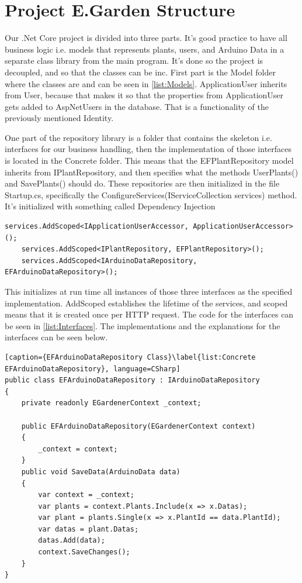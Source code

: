\documentclass[a4paper,12pt,oneside,openright,titlepage]{book}
\begin{document}
\section{Project E.Garden Structure}
Our .Net Core project is divided into three parts. It's good practice to have all business logic i.e. models that represents plants, users, and Arduino Data in a separate class library from the main program. It's done so the project is decoupled, and so that the classes can be inc. First part is the Model folder where the classes are and can be seen in \ref{list:Models}. ApplicationUser inherits from User, because that makes it so that the properties from ApplicationUser gets added to AspNetUsers in the database. That is a functionality of the previously mentioned Identity. 


One part of the repository library is a folder that contains the skeleton i.e. interfaces for our business handling, then the implementation of those interfaces is located in the Concrete folder. This means that the EFPlantRepository model inherits from IPlantRepository, and then specifies what the methods UserPlants() and SavePlants() should do. These repositories are then initialized in the file Startup.cs, specifically the ConfigureServices(IServiceCollection services) method. It's initialized with something called Dependency Injection\cite{DependencyInjection}


\label{list:DpInjection}
\begin{lstlisting}[caption={Dependency Injection}, language=CSharp]
	services.AddScoped<IApplicationUserAccessor, ApplicationUserAccessor>();
	services.AddScoped<IPlantRepository, EFPlantRepository>();
    services.AddScoped<IArduinoDataRepository, EFArduinoDataRepository>();
\end{lstlisting}

This initializes at run time all instances of those three interfaces as the specified implementation. AddScoped establishes the lifetime of the services, and scoped means that it is created once per HTTP request. The code for the interfaces can be seen in \ref{list:Interfaces}. The implementations and the explanations for the interfaces can be seen below.

\begin{lstlisting}[caption={EFArduinoDataRepository Class}\label{list:Concrete EFArduinoDataRepository}, language=CSharp]
public class EFArduinoDataRepository : IArduinoDataRepository
{
	private readonly EGardenerContext _context;
        
	public EFArduinoDataRepository(EGardenerContext context)
	{
        _context = context;
	}
	public void SaveData(ArduinoData data)
	{
		var context = _context;
		var plants = context.Plants.Include(x => x.Datas);
	    var plant = plants.Single(x => x.PlantId == data.PlantId);
        var datas = plant.Datas;
        datas.Add(data);
		context.SaveChanges();
	}
}
\end{lstlisting}
\end{document}
